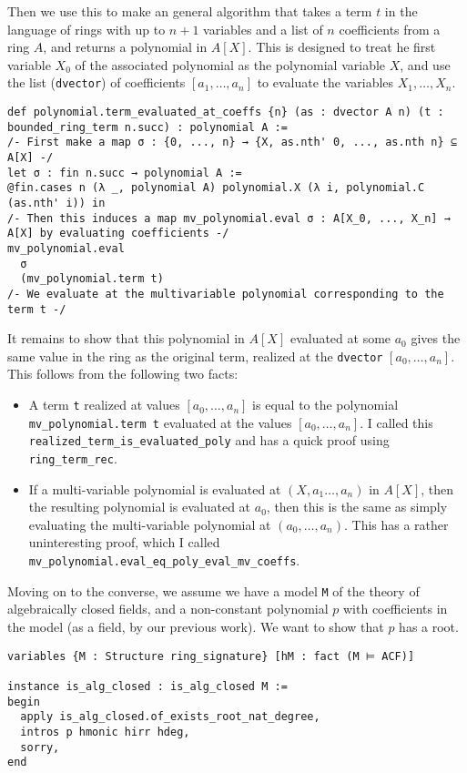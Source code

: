 Then we use this to make an general algorithm that takes
a term $t$ in the language of rings with up to $n + 1$ variables
and a list of $n$ coefficients from a ring $A$,
and returns a polynomial in $A[X]$.
This is designed to treat he first variable $X_{0}$ of the associated polynomial
as the polynomial variable $X$,
and use the list (\texttt{dvector}) of coefficients
$[a_{1},\dots,a_{n}]$ to evaluate the variables $X_{1},\dots,X_{n}$.

\begin{lstlisting}
def polynomial.term_evaluated_at_coeffs {n} (as : dvector A n) (t : bounded_ring_term n.succ) : polynomial A :=
/- First make a map σ : {0, ..., n} → {X, as.nth' 0, ..., as.nth n} ⊆ A[X] -/
let σ : fin n.succ → polynomial A :=
@fin.cases n (λ _, polynomial A) polynomial.X (λ i, polynomial.C (as.nth' i)) in
/- Then this induces a map mv_polynomial.eval σ : A[X_0, ..., X_n] → A[X] by evaluating coefficients -/
mv_polynomial.eval
  σ
  (mv_polynomial.term t)
/- We evaluate at the multivariable polynomial corresponding to the term t -/
\end{lstlisting}

It remains to show that this polynomial in $A[X]$
evaluated at some $a_{0}$ gives the same value in the ring as the original term,
realized at the \texttt{dvector} $[a_{0},\dots,a_{n}]$.
This follows from the following two facts:
\begin{itemize}
  \item A term \texttt{t} realized at values $[a_{0},\dots,a_{n}]$ is equal to
        the polynomial \texttt{mv\_polynomial.term t}
        evaluated at the values $[a_{0},\dots,a_{n}]$.
        I called this \texttt{realized\_term\_is\_evaluated\_poly}
        and has a quick proof using \texttt{ring\_term\_rec}.
  \item If a multi-variable polynomial is evaluated at $(X,a_{1}\dots,a_{n})$
        in $A[X]$, then the resulting polynomial is evaluated at $a_{0}$,
        then this is the same as simply evaluating the multi-variable polynomial
        at $(a_{0},\dots,a_{n})$.
        This has a rather uninteresting proof,
        which I called \texttt{mv\_polynomial.eval\_eq\_poly\_eval\_mv\_coeffs}.
\end{itemize}

Moving on to the converse, we assume we have a model \texttt{M} of the theory
of algebraically closed fields, and a non-constant polynomial $p$
with coefficients in the model (as a field, by our previous work).
We want to show that $p$ has a root.
\begin{lstlisting}
variables {M : Structure ring_signature} [hM : fact (M ⊨ ACF)]

instance is_alg_closed : is_alg_closed M :=
begin
  apply is_alg_closed.of_exists_root_nat_degree,
  intros p hmonic hirr hdeg,
  sorry,
end\end{lstlisting}

